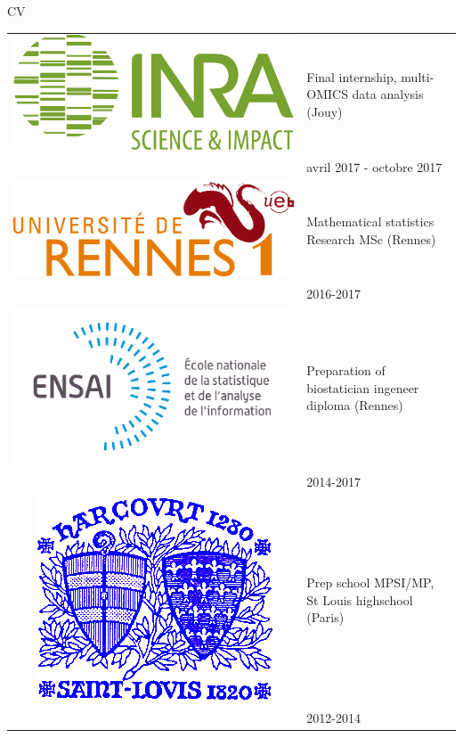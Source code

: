 \documentclass[9pt]{beamer}
\begin{document}
\begin{frame}{CV}
\begin{tabular}{c l}
\includegraphics[scale=0.07]{logo_inra}&  Final internship, multi-OMICS data analysis (Jouy)\\
& avril 2017 - octobre 2017 \\
     \includegraphics[scale=0.25]{logo_univ.jpg}& Mathematical statistics Research MSc (Rennes) \\
     &2016-2017 \\
    \includegraphics[scale=0.4]{logo_ensai.jpg} & Preparation of biostatician ingeneer diploma (Rennes)\\
    & 2014-2017\\
    \includegraphics[scale=0.25]{Logo-SL.png} & Prep school MPSI/MP, St Louis highschool (Paris)
\\
&2012-2014\\
\end{tabular}
\end{frame}
\end{document}

